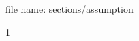 \documentclass[../main.tex]{subfiles}
\begin{document}
  file name: sections/assumption
  \begin{assumption}\label{asu:shunshi}
    1
  \end{assumption}
  
\end{document}
